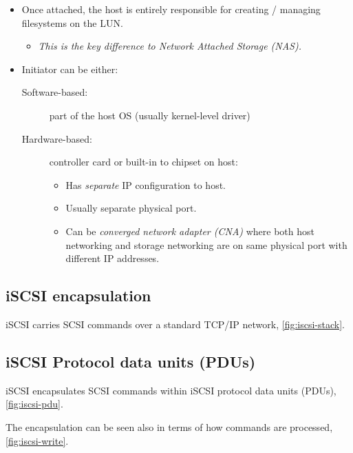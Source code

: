 \documentclass[slides]{pgnotes}
\begin{document}
\begin{itemize}
\item
  Once attached, the host is entirely responsible for creating / managing filesystems on the LUN.
  \begin{itemize}
  \item  \emph{This is the key difference to Network Attached Storage (NAS).}
  \end{itemize}
\item
  Initiator can be either:
  \begin{description}
  \item[Software-based:]
    part of the host OS (usually kernel-level driver)
  \item[Hardware-based:]
    controller card or built-in to chipset on host:
    \begin{itemize}
    \item Has \emph{separate} IP configuration to host.
    \item Usually separate physical port.
    \item Can be \emph{converged network adapter (CNA)} where both host networking and storage networking are on same physical port with different IP addresses.
    \end{itemize}
  \end{description}
\end{itemize}


\subsection{iSCSI encapsulation}
\label{sec:encapsulation}

iSCSI carries SCSI commands over a standard TCP/IP network, \autoref{fig:iscsi-stack}.


\subsection{iSCSI Protocol data units (PDUs)}
\label{sec:iscsi-pdu}

iSCSI encapsulates SCSI commands within iSCSI protocol data units (PDUs), \autoref{fig:iscsi-pdu}.

The encapsulation can be seen also in terms of how commands are processed, \autoref{fig:iscsi-write}.

\end{document}
